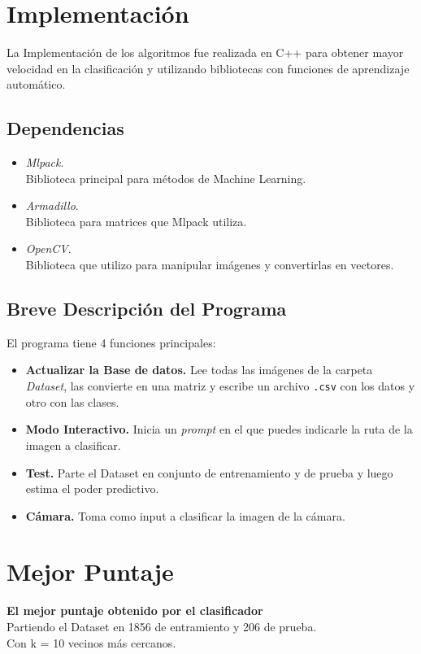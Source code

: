 \documentclass{article}
\begin{document}
    
    \section{Implementación}
    La Implementación de los algoritmos fue realizada en C++ para obtener mayor velocidad en la clasificación y utilizando bibliotecas con funciones de aprendizaje automático.
    \subsection{Dependencias}
    \begin{itemize}
    \item \emph{Mlpack}.\\
    Biblioteca principal para métodos de Machine Learning.
    \item \emph{Armadillo}.\\
    Biblioteca para matrices que Mlpack utiliza.
    \item \emph{OpenCV}.\\
    Biblioteca que utilizo para manipular imágenes y convertirlas en vectores.
    \end{itemize}
    
    \subsection{Breve Descripción del Programa}
    El programa tiene 4 funciones principales:
    \begin{itemize}
     \item \textbf{Actualizar la Base de datos.} Lee todas las imágenes de la carpeta \emph{Dataset}, las convierte en una matriz y escribe un archivo \texttt{.csv}  con los datos y otro con las 
clases.
    \item \textbf{Modo Interactivo.} Inicia un \emph{prompt} en el que puedes indicarle la ruta de la imagen a clasificar.
    \item \textbf{Test.} Parte el Dataset en conjunto de entrenamiento y de prueba y luego estima el poder predictivo.
    \item \textbf{Cámara.} Toma como input a clasificar la imagen de la cámara.
    \end{itemize}
   
    \section{Mejor Puntaje}
    \textbf{El mejor puntaje obtenido por el clasificador}\\
    Partiendo el Dataset en 1856 de entramiento y 206 de prueba.\\
    Con k = 10 vecinos más cercanos.\\
\end{document}
